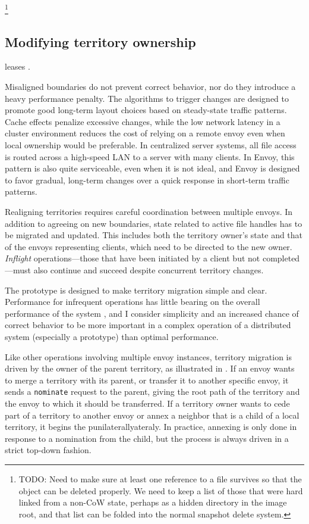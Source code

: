 \footnote{TODO: Need to make sure at least one reference to a file survives so that the object can be deleted properly. We need to keep a list of those that were hard linked from a non-CoW state, perhaps as a hidden directory in the image root, and that list can be folded into the normal snapshot delete system.}

\subsection{Modifying territory ownership}

leases \cite{gray89}.

Misaligned boundaries do not prevent correct behavior, nor do they introduce a heavy performance penalty. The algorithms to trigger changes are designed to promote good long-term layout choices based on steady-state traffic patterns. Cache effects penalize excessive changes, while the low network latency in a cluster environment reduces the cost of relying on a remote envoy even when local ownership would be preferable. In centralized server systems, all file access is routed across a high-speed LAN to a server with many clients. In Envoy, this pattern is also quite serviceable, even when it is not ideal, and Envoy is designed to favor gradual, long-term changes over a quick response in short-term traffic patterns.

Realigning territories requires careful coordination between multiple envoys. In addition to agreeing on new boundaries, state related to active file handles has to be migrated and updated. This includes both the territory owner's state and that of the envoys representing clients, which need to be directed to the new owner. \emph{Inflight} operations---those that have been initiated by a client but not completed---must also continue and succeed despite concurrent territory changes.

The prototype is designed to make territory migration simple and clear. Performance for infrequent operations has little bearing on the overall performance of the system \cite{amdahl}, and I consider simplicity and an increased chance of correct behavior to be more important in a complex operation of a distributed system (especially a prototype) than optimal performance.

Like other operations involving multiple envoy instances, territory migration is driven by the owner of the parent territory, as illustrated in . If an envoy wants to merge a territory with its parent, or transfer it to another specific envoy, it sends a \texttt{nominate} request to the parent, giving the root path of the territory and the envoy to which it should be transferred. If a territory owner wants to cede part of a territory to another envoy or annex a neighbor that is a child of a local territory, it begins the punilaterallyateraly. In practice, annexing is only done in response to a nomination from the child, but the process is always driven in a strict top-down fashion.

